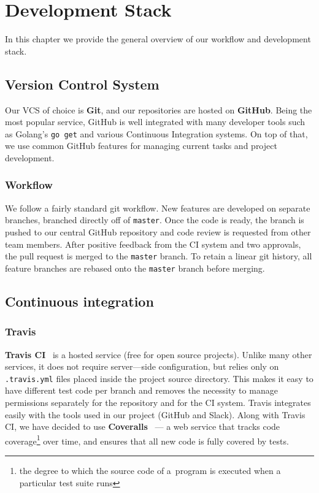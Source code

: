 \chapter{Development Stack}

In this chapter we provide the general overview of our workflow and
development stack.

\section{Version Control System}
Our VCS of choice is \textbf{Git}, and our repositories are hosted on 
\textbf{GitHub}. Being the most popular service, GitHub is well integrated 
with many developer tools such as Golang’s \texttt{go get} and various 
Continuous Integration systems. On top of that, we use common GitHub features 
for managing current tasks and project development.

\subsection{Workflow}
We follow a fairly standard git workflow. New features are developed on 
separate branches, branched directly off of \texttt{master}. Once the code 
is ready, the branch is pushed to our central GitHub repository and code 
review is requested from other team members. After positive feedback from 
the CI system and two approvals, the pull request is merged to the 
\texttt{master} branch. To retain a linear git history, all feature branches 
are rebased onto the \texttt{master} branch before merging.

\section{Continuous integration}

\subsection{Travis}
\textbf{Travis CI}~\cite{travis} is a hosted service (free for open source 
projects). Unlike many other services, it does not require server---side 
configuration, but relies only on \texttt{.travis.yml} files placed inside 
the project source directory. This makes it easy to have different test 
code per branch and removes the necessity to manage permissions separately 
for the repository and for the CI system. Travis integrates easily with the 
tools used in our project (GitHub and Slack). Along with Travis CI, we have 
decided to use \textbf{Coveralls}~\cite{coveralls} --- a web service that 
tracks code coverage\footnote{the degree to which the source code of a~program 
is executed when a particular test suite runs} over time, and ensures that 
all new code is fully covered by tests.

